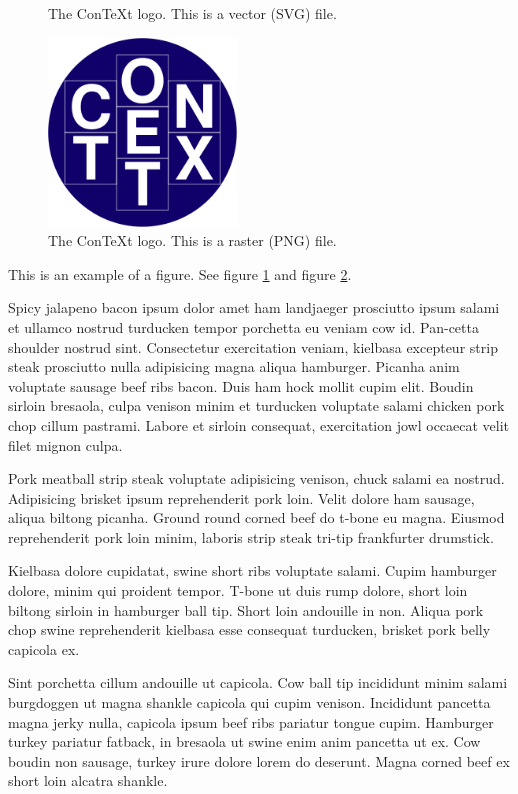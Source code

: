 \documentclass{article}
\begin{document}
\begin{figure}
  \centering
  
  \caption{The ConTeXt logo. This is a vector (SVG) file.}
  \label{fig-vector}
\end{figure}

\begin{figure}
  \centering
  \includegraphics[width=5cm]{./ConTeXt_Unofficial_Logo.png}
  \caption{The ConTeXt logo. This is a raster (PNG) file.}
  \label{fig-raster}
\end{figure}

This is an example of a figure. See figure \ref{fig-vector} and figure \ref{fig-raster}.

 Spicy jalapeno bacon ipsum dolor amet ham landjaeger prosciutto ipsum salami et ullamco nostrud turducken tempor porchetta eu veniam cow id. Pan-cetta shoulder nostrud sint. Consectetur exercitation veniam, kielbasa excepteur strip steak prosciutto nulla adipisicing magna aliqua hamburger. Picanha anim voluptate sausage beef ribs bacon. Duis ham hock mollit cupim elit. Boudin sirloin bresaola, culpa venison minim et turducken voluptate salami chicken pork chop cillum pastrami. Labore et sirloin consequat, exercitation jowl occaecat velit filet mignon culpa.

 Pork meatball strip steak voluptate adipisicing venison, chuck salami ea nostrud. Adipisicing brisket ipsum reprehenderit pork loin. Velit dolore ham sausage, aliqua biltong picanha. Ground round corned beef do t-bone eu magna. Eiusmod reprehenderit pork loin minim, laboris strip steak tri-tip frankfurter drumstick.

 Kielbasa dolore cupidatat, swine short ribs voluptate salami. Cupim hamburger dolore, minim qui proident tempor. T-bone ut duis rump dolore, short loin biltong sirloin in hamburger ball tip. Short loin andouille in non. Aliqua pork chop swine reprehenderit kielbasa esse consequat turducken, brisket pork belly capicola ex.

 Sint porchetta cillum andouille ut capicola. Cow ball tip incididunt minim salami burgdoggen ut magna shankle capicola qui cupim venison. Incididunt pancetta magna jerky nulla, capicola ipsum beef ribs pariatur tongue cupim. Hamburger turkey pariatur fatback, in bresaola ut swine enim anim pancetta ut ex. Cow boudin non sausage, turkey irure dolore lorem do deserunt. Magna corned beef ex short loin alcatra shankle.
\end{document}

